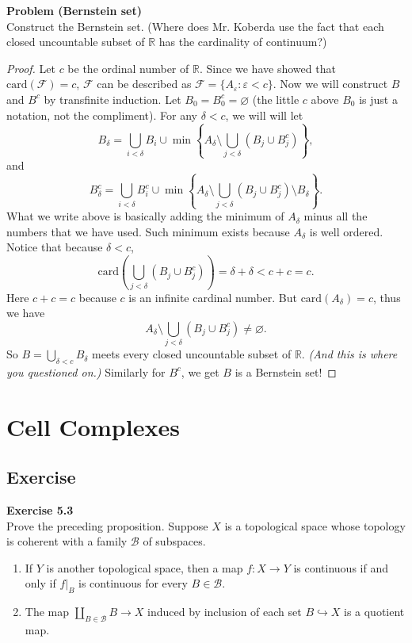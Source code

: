 \documentclass[12pt, a4paper]{article}
\theoremstyle{plain}
\newcommand{\B}{\mathscr{B}}
\newcommand{\R}{\mathbb{R}}
\newcommand{\F}{\mathcal{F}}
\def\epsilon{\varepsilon}
\newenvironment{exercise}[2][Exercise]
    { \begin{mdframed}[backgroundcolor=gray!20] \textbf{#1 #2} \\}
    {  \end{mdframed}}
\newenvironment{problem}[2][Problem]
    { \begin{mdframed}[backgroundcolor=gray!20] \textbf{#1 #2} \\}
    {  \end{mdframed}}
\begin{document}
\begin{problem}{(Bernstein set)}
Construct the Bernstein set. (Where does Mr. Koberda use the fact that each closed uncountable subset of $\R$ has the cardinality of continuum?) 
\end{problem}
	\begin{proof}
	Let $c$ be the ordinal number of $\R$. Since we have showed that $\text{card}(\F)=c$, $\F$ can be described as $\F = \{A_\epsilon: \epsilon < c\}$. Now we will construct $B$ and $B^c$ by transfinite induction. Let $B_0=B_0^c=\varnothing$ (the little $c$ above $B_0$ is just a notation, not the compliment). For any $\delta<c$, we will will let
	\[
	B_\delta = \bigcup_{i<\delta}B_i \cup \min\left\{A_\delta\setminus \bigcup_{j<\delta}(B_j\cup B_j^c)\right\},
	\]
	and
	\[
	B_\delta^c = \bigcup_{i<\delta}B_i^c \cup \min\left\{A_\delta\setminus \bigcup_{j<\delta}(B_j\cup B_j^c) \setminus B_\delta \right\}.
	\]
	What we write above is basically adding the minimum of $A_\delta$ minus all the numbers that we have used. Such minimum exists because $A_\delta$ is well ordered. Notice that because $\delta < c$, 
	\[
	\text{card}\left(\bigcup_{j<\delta}(B_j\cup B_j^c)\right) = \delta +\delta < c + c = c.
	\]
	Here $c+c=c$ because $c$ is an infinite cardinal number. But $\text{card}(A_\delta)=c$, thus we have
	\[
	A_\delta\setminus \bigcup_{j<\delta}(B_j\cup B_j^c)\neq \varnothing.
	\]
	So $B = \bigcup_{\delta<c}B_\delta$ meets every closed uncountable subset of $\R$. \textit{(And this is where you questioned on.)} Similarly for $B^c$, we get $B$ is a Bernstein set!
	\end{proof}


\section{Cell Complexes}

\subsection{Exercise}

\begin{exercise}{5.3}
    Prove the preceding proposition. Suppose $X$ is a topological space whose topology is coherent with a family $\B$ of subspaces.
    \begin{enumerate}[label=(\alph*)]
        \item If $Y$ is another topological space, then a map $f\colon X\to Y$ is continuous if and only if $f|_B$ is continuous for every $B\in \B$.

        \item The map $\coprod_{B\in \B}B\to X$ induced by inclusion of each set $B\hookrightarrow X$ is a quotient map.
    \end{enumerate}
\end{exercise}
\end{document}
